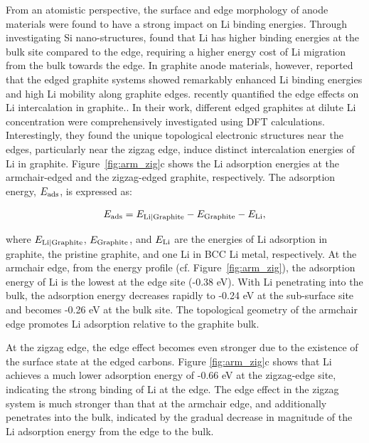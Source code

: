 \documentclass[../main.tex]{subfiles}
\begin{document}
From an atomistic perspective, the surface and edge morphology of anode materials were found to have a strong impact on Li binding energies.\cite{uthaisar2010edge,leggesse2016lithium} Through investigating Si nano-structures, \citeauthor{chan2010controlling} found that Li has higher binding energies at the bulk site compared to the edge, requiring a higher energy cost of Li migration from the bulk towards the edge.\cite{chan2010controlling} In graphite anode materials, however, \citeauthor{leggesse2016lithium} reported that the edged graphite systems showed remarkably enhanced Li binding energies and high Li mobility along graphite edges.\cite{leggesse2016lithium} \citeauthor{peng2020lithium} recently quantified the edge effects on Li intercalation in graphite.\cite{peng2020lithium}. In their work, different edged graphites at dilute Li concentration were comprehensively investigated using DFT calculations. Interestingly, they found the unique topological electronic structures near the edges, particularly near the zigzag edge, induce distinct intercalation energies of Li in graphite. Figure~\ref{fig:arm_zig}c shows the Li adsorption energies at the armchair-edged and the zigzag-edged graphite, respectively. The adsorption energy, $E_{\rm{ads}}$, is expressed as:

\begin{equation}
E_{\rm{ads}} = E_{\rm{Li|Graphite}}-E_{\rm{Graphite}}-E_{\rm{Li}},
\label{eq:adsorption_energy}
\end{equation}

where $E_{\rm{Li|Graphite}}$, $E_{\rm{Graphite}}$, and $E_{\rm{Li}}$ are the energies of Li adsorption in graphite, the pristine graphite, and one Li in BCC Li metal, respectively. At the armchair edge, from the energy profile (cf. Figure~\ref{fig:arm_zig}), the adsorption energy of Li is the lowest at the edge site (-0.38 eV). With Li penetrating into the bulk, the adsorption energy decreases rapidly to -0.24 eV at the sub-surface site and becomes -0.26 eV at the bulk site. The topological geometry of the armchair edge promotes Li adsorption relative to the graphite bulk.

At the zigzag edge, the edge effect becomes even stronger due to the existence of the surface state at the edged carbons.\cite{fujita1996peculiar,lee2005magnetic} Figure \ref{fig:arm_zig}c shows that Li achieves a much lower adsorption energy of -0.66 eV at the zigzag-edge site, indicating the strong binding of Li at the edge. The edge effect in the zigzag system is much stronger than that at the armchair edge, and additionally penetrates into the bulk, indicated by the gradual decrease in magnitude of the Li adsorption energy from the edge to the bulk. 
\end{document}
